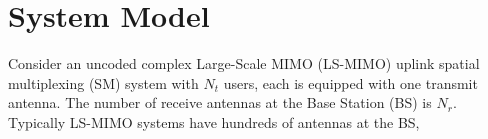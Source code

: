 \documentclass[12pt, draftclsnofoot, onecolumn]{IEEEtran}
\begin{document}
\section{System Model}
% 
% 
% 
% 

 
Consider an uncoded complex Large-Scale MIMO (LS-MIMO) uplink spatial multiplexing (SM) system with $N_{t}$ users, each is equipped with one transmit antenna. The number of receive antennas at the Base Station (BS) is $N_{r}$. Typically LS-MIMO systems have hundreds of antennas at the BS, 
    
\end{document}
